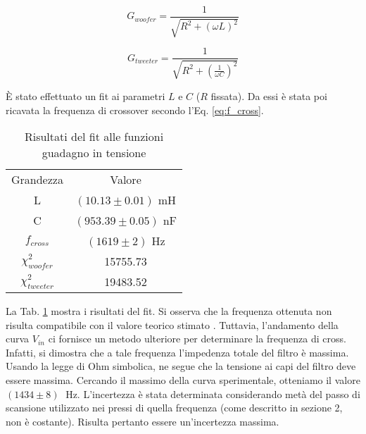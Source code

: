 \documentclass[../Relazione_circuiti]{subfiles}
\begin{document}
  \begin{equation}
    \label{eq:gain_woofer}
    G_{woofer} = \frac{1}{\sqrt{R^2+(\omega L)^2}}
  \end{equation}

  \begin{equation}
    \label{eq:gain_tweeter}
    G_{tweeter} = \frac{1}{\sqrt{R^2+(\frac{1}{\omega C})^2}}
  \end{equation}



  È stato effettuato un fit ai parametri $L$ e $C$ ($R$ fissata).
  Da essi è stata poi ricavata la frequenza di crossover secondo l'Eq. \eqref{eq:f_cross}.

  \begin{table}[H]
    \centering

    \begin{tabular}{c | c }

      Grandezza & Valore                 \\

      L         & $(10.13 \pm 0.01)$ mH  \\
      C         & $(953.39 \pm 0.05)$ nF \\
      $f_{cross}$ & $(1619 \pm 2)$ Hz \\
	$\chi^2_{woofer}$	& 15755.73  \\
	$\chi^2_{tweeter}$ & 19483.52  

    \end{tabular}

    \caption{Risultati del fit alle funzioni guadagno in tensione}
    \label{tab:fit_amplitude}

  \end{table}

  La Tab. \ref{tab:fit_amplitude} mostra i risultati del fit.
  Si osserva che la frequenza ottenuta non risulta compatibile con il valore teorico stimato \theoryF.
  Tuttavia, l'andamento della curva $V_{in}$ ci fornisce un metodo ulteriore per determinare la frequenza di cross.
  Infatti, si dimostra che a tale frequenza l'impedenza totale del filtro è massima.
  Usando la legge di Ohm simbolica, ne segue che la tensione ai capi del filtro deve essere massima.
  Cercando il massimo della curva sperimentale, otteniamo il valore $(1434 \pm 8) \;$ Hz.
  L'incertezza è stata determinata considerando metà del passo di scansione utilizzato nei pressi di quella frequenza
  (come descritto in sezione 2, non è costante). Risulta pertanto essere un'incertezza massima.
  
\end{document}
